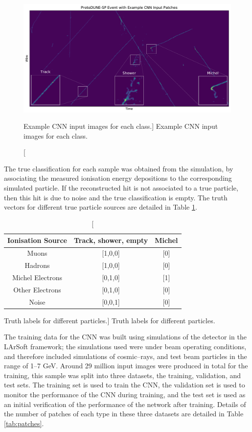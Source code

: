 \begin{figure}
	\centering
	\includegraphics[width=\textwidth]{figures/patch_zoom.pdf}  
	\caption
	[Example CNN input images for each class.]
	{Example CNN input images for each class.}
	\label{fig:patches}
\end{figure}

The true classification for each sample was obtained from the simulation, by 
associating the measured ionisation energy depositions to the corresponding
simulated particle. If the reconstructed hit is not associated to a true
particle, then this hit is due to noise and the true classification is empty.
The truth vectors for different true particle sources are detailed in Table
\ref{tab:ground_truth}. 

\begin{table}
	\centering
	\begin{tabular}{c|c|c}
		Ionisation Source & Track, shower, empty & Michel \\ \hline
		Muons             & [1,0,0]              & [0]    \\
		Hadrons           & [1,0,0]              & [0]    \\
		Michel Electrons  & [0,1,0]              & [1]    \\
		Other Electrons   & [0,1,0]              & [0]    \\
		Noise             & [0,0,1]              & [0]    \\
	\end{tabular}
	\caption
	[Truth labels for different particles.]
	{Truth labels for different particles.}
	\label{tab:ground_truth}
\end{table}

The training data for the CNN was built using simulations of the \protodune{}
detector in the LArSoft framework; the simulations used were under beam
operating conditions, and therefore included simulations of cosmic--rays, and
test beam particles in the range of 1--7 GeV. Around 29 million input images
were produced in total for the training, this sample was split into three
datasets, the training, validation, and test sets. The training set is used to
train the CNN, the validation set is used to monitor the performance of the CNN
during training, and the test set is used as an initial verification of the 
performance of the network after training. Details of the number of patches of
each type in these three datasets are detailed in Table \ref{tab:patches}.

